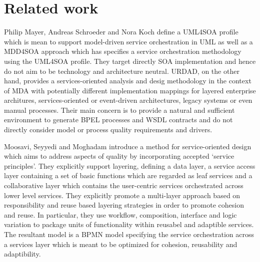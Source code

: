 \section{Related work}
\label{sec:relatedWork}

\cite{chitforoush_methodology_2007}

Philip Mayer, Andreas Schroeder and Nora Koch\cite{mayer_mdd4soa:_2008} define a UML4SOA profile which is mean to support model-driven service orchestration in UML as well as a MDD4SOA approach which has specifies a service orchestration methodology using the UML4SOA profile. They target directly SOA implementation and hence do not aim to be technology and architecture neutral. URDAD, on the other hand, provides a services-oriented analysis and desig methodology in the context of MDA with potentially different implementation mappings for layered enterprise architures, services-oriented or event-driven architectures, legacy systems or even manual processes. Their main concern is to provide a natural and sufficient environment to generate BPEL processes and WSDL contracts and do not directly consider model or process quality requirements and drivers.

Moosavi, Seyyedi and Moghadam\cite{moosavi_method_2009} introduce a method for service-oriented design which aims to address aspects of quality by incorporating accepted `service principles'. They explicitly support layering, defining a data layer, a service access layer containing a set of basic functions which are regarded as leaf services and a collaborative layer which contains the user-centric services orchestrated across lower level services. They explicitly promote a multi-layer approach based on responsibility and reuse based layering strategies in order to promote cohesion and reuse. In particular, they use workflow, composition, interface and logic variation to package units of functionality within reusabel and adaptible services. The resultant model is a BPMN model specifying the service orchestration across a services layer which is meant to be optimized for cohesion, reusability and adaptibility.

\cite{cardei_model_2008}

\cite{shim_design_2008}

